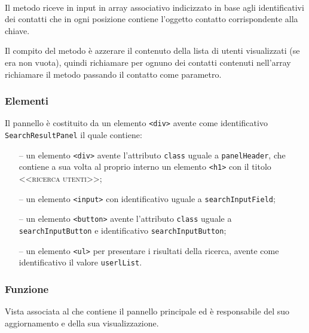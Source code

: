 \begin{description}
  \item{}\\
  Il metodo riceve in input in array associativo indicizzato in base agli identificativi dei contatti che in ogni posizione contiene l'oggetto contatto corrispondente alla chiave.
  
  Il compito del metodo è azzerare il contenuto della lista di utenti visualizzati (se era non vuota), quindi richiamare per ognuno dei contatti contenuti nell'array richiamare il metodo  passando il contatto come parametro.
  
\end{description}

\subsubsection*{Elementi}
Il pannello è costituito da un elemento \verb'<div>' avente come identificativo \verb'SearchResultPanel' il quale contiene:
\begin{itemize}
  \item[--] un elemento \verb'<div>' avente l'attributo \verb'class' uguale a \verb'panelHeader', che contiene a sua volta al proprio interno un elemento \verb'<h1>' con il titolo \textsc{<<ricerca utenti>>};
  \item[--] un elemento \verb'<input>' con identificativo uguale a \verb'searchInputField';
  \item[--] un elemento \verb'<button>' avente l'attributo \verb'class' uguale a \verb'searchInputButton' e identificativo \verb'searchInputButton';
  \item[--] un elemento \verb'<ul>' per presentare i risultati della ricerca, avente come identificativo il valore \verb'userlList'.
\end{itemize}

\subsubsection*{Funzione}
Vista associata al  che contiene il pannello principale ed è responsabile del suo aggiornamento e della sua visualizzazione.

